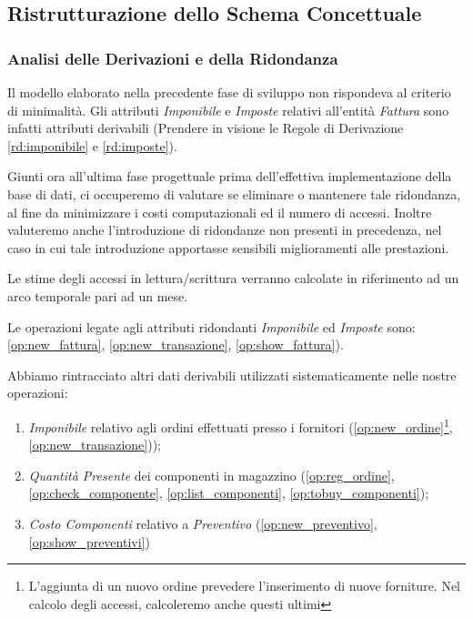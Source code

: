	\subsection{Ristrutturazione dello Schema Concettuale}

		\subsubsection{Analisi delle Derivazioni e della Ridondanza}

			Il modello elaborato nella precedente fase di sviluppo non rispondeva al criterio di minimalità. Gli attributi \emph{Imponibile} e \emph{Imposte} relativi all'entità \emph{Fattura} sono infatti attributi derivabili (Prendere in visione le Regole di Derivazione \ref{rd:imponibile} e \ref{rd:imposte}).

			Giunti ora all'ultima fase progettuale prima dell'effettiva implementazione della base di dati, ci occuperemo di valutare se eliminare o mantenere tale ridondanza, al fine da minimizzare i costi computazionali ed il numero di accessi. Inoltre valuteremo anche l'introduzione di ridondanze non presenti in precedenza, nel caso in cui tale introduzione apportasse sensibili miglioramenti alle prestazioni.

			Le stime degli accessi in lettura/scrittura verranno calcolate in riferimento ad un arco temporale pari ad un mese.

			Le operazioni legate agli attributi ridondanti \emph{Imponibile} ed \emph{Imposte} sono: \ref{op:new_fattura}, \ref{op:new_transazione}, \ref{op:show_fattura}).

			Abbiamo rintracciato altri dati derivabili utilizzati sistematicamente nelle nostre operazioni:

			\begin{enumerate}

				\item \emph{Imponibile} relativo agli ordini effettuati presso i fornitori (\ref{op:new_ordine}\footnote{L'aggiunta di un nuovo ordine prevedere l'inserimento di nuove forniture. Nel calcolo degli accessi, calcoleremo anche questi ultimi}, \ref{op:new_transazione}));
			
				\item \emph{Quantità Presente} dei componenti in magazzino (\ref{op:reg_ordine}, \ref{op:check_componente}, \ref{op:list_componenti}, \ref{op:tobuy_componenti});
			
				\item \emph{Costo Componenti} relativo a \emph{Preventivo} (\ref{op:new_preventivo}, \ref{op:show_preventivi})
			
			\end{enumerate}


